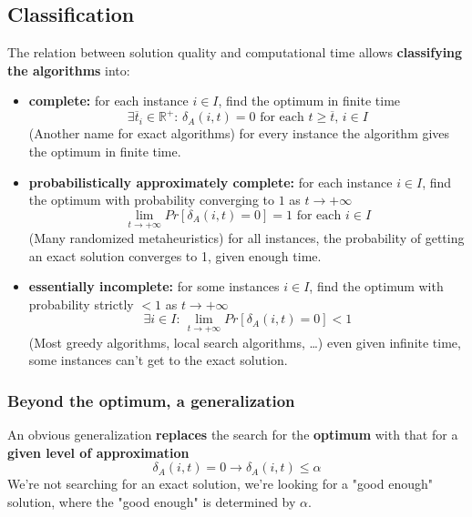 \newpage

\subsection{Classification}
The relation between solution quality and computational time allows \textbf{classifying the algorithms} into:
\begin{itemize}
	\item \textbf{complete:} for each instance $i \in I$, find the optimum in finite time
	$$ \exists \overline{t}_i \in \mathbb{R}^+ : \, \delta_A (i, t) = 0 \text{ for each } t \geq \overline{t}, \, i \in I $$
	(Another name for exact algorithms) for every instance the algorithm gives the optimum in finite time. \\
	
	\item \textbf{probabilistically approximately complete:} for each instance $i \in I$, find the optimum with probability converging to $1$ as $t \rightarrow + \infty$
	$$ \lim_{t \rightarrow + \infty} Pr \left[\delta_A (i, t) = 0\right] = 1 \text{ for each } i \in I $$
	(Many randomized metaheuristics) for all instances, the probability of getting an exact solution converges to 1, given enough time. \\
	
	\item \textbf{essentially incomplete:} for some instances $i \in I$, find the optimum with probability strictly $< 1$ as $t \rightarrow + \infty$
	$$ \exists i \in I: \, \lim_{t \rightarrow + \infty} Pr \left[\delta_A (i, t) = 0 \right] < 1 $$
	(Most greedy algorithms, local search algorithms, \dots) even given infinite time, some instances can't get to the exact solution. \\
\end{itemize}

\newpage

\subsubsection{Beyond the optimum, a generalization}
An obvious generalization \textbf{replaces} the search for the \textbf{optimum} with that for a \textbf{given level of approximation}
$$ \delta_A (i, t) = 0 \rightarrow \delta_A (i, t) \leq \alpha $$
We're not searching for an exact solution, we're looking for a "good enough" solution, where the "good enough" is determined by $\alpha$.\\

